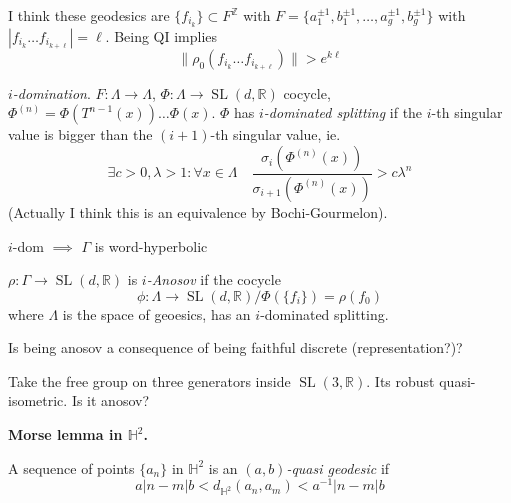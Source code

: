 I think these geodesics are $\{f_{i_{k}}\}
\subset F^{\mathbb{Z}}$ with $F=\{a^{\pm
1}_1,b_1^{\pm 1},\ldots,a_g^{\pm 1},b_g^{\pm
1}\}$ with $|f_{i_k}\ldots f_{i_{k+\ell}}|
=\ell$.
Being QI implies
$$\|\rho_0(f_{i_k}\ldots f_{i_{k+
\ell}})\|>e^{k\ell}$$

\begin{definition}
\label{definition-potrie-i-domination}
\textit{$i$-domination}. $F:\Lambda \to
\Lambda$, $\Phi:\Lambda \to
\operatorname{SL}(d,\mathbb{R})$ cocycle,
$\Phi^{(n)}=\Phi(T^{n-1}(x))\ldots \Phi(x)$.
$\Phi$ has \textit{$i$-dominated splitting}
if the $i$-th singular value is bigger than
the $(i+1)$-th singular value, ie.
$$\exists c>0,\lambda>1 : \forall x\in\Lambda
\quad
\dfrac{\sigma_i(\Phi^{(n)}(x))}
{\sigma_{i+1}(\Phi^{(n)}(x))}>c\lambda^n$$
(Actually I think this is an equivalence by
Bochi-Gourmelon).
\end{definition}

\begin{theorem}
\label{theorem-potrie-klp-bps}
$i$-dom $\implies $ $\Gamma$ is
word-hyperbolic
\end{theorem}

\begin{definition}[Rafael and
collaborators=BPS]
\label{definition-potrie-i-anosov}
$\rho:\Gamma\to
\operatorname{SL}(d,\mathbb{R})$ is
\textit{$i$-Anosov} if the cocycle
$$\phi:\Lambda\to
\operatorname{SL}(d,\mathbb{R})
/\Phi(\{f_i\})=\rho(f_0)$$
where $\Lambda$ is the space of geoesics, has
an $i$-dominated splitting.
\end{definition}

\begin{remark}[Question]
\label{remark-potrie-question-anosov}
Is being anosov a consequence of being
faithful discrete (representation?)?
\end{remark}

\begin{remark}[Question]
\label{remark-potrie-question-free-group}
Take the free group on three generators
inside $\operatorname{SL}(3,\mathbb{R})$. Its
robust quasi-isometric. Is it anosov?
\end{remark}

\medskip\noindent
{\bf Morse lemma in $\mathbb{H}^2$.}

\begin{definition}
\label{definition-potrie-quasi-geodesic}
A sequence of points $\{a_n\}$ in
$\mathbb{H}^2$ is an \textit{$(a,b)$-quasi
geodesic} if
$$a |n-m|b<d _{\mathbb{H}^2}(a_n,a_m)<a^{-1}
|n-m|b$$
\end{definition}

